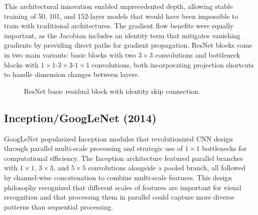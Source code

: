 This architectural innovation enabled unprecedented depth, allowing stable training of 50, 101, and 152-layer models that would have been impossible to train with traditional architectures. The gradient flow benefits were equally important, as the Jacobian includes an identity term that mitigates vanishing gradients by providing direct paths for gradient propagation. ResNet blocks come in two main variants: basic blocks with two $3\times3$ convolutions and bottleneck blocks with $1\times1$-$3\times3$-$1\times1$ convolutions, both incorporating projection shortcuts to handle dimension changes between layers.\cite{He2016}

\begin{figure}[h]
    \centering
    \caption{ResNet basic residual block with identity skip connection.}
    \label{fig:resnet-block}
\end{figure}

\subsection{Inception/GoogLeNet (2014)}
\label{subsec:inception}

GoogLeNet popularized Inception modules that revolutionized CNN design through parallel multi-scale processing and strategic use of $1\times1$ bottlenecks for computational efficiency. The Inception architecture featured parallel branches with $1\times1$, $3\times3$, and $5\times5$ convolutions alongside a pooled branch, all followed by channel-wise concatenation to combine multi-scale features. This design philosophy recognized that different scales of features are important for visual recognition and that processing them in parallel could capture more diverse patterns than sequential processing.

